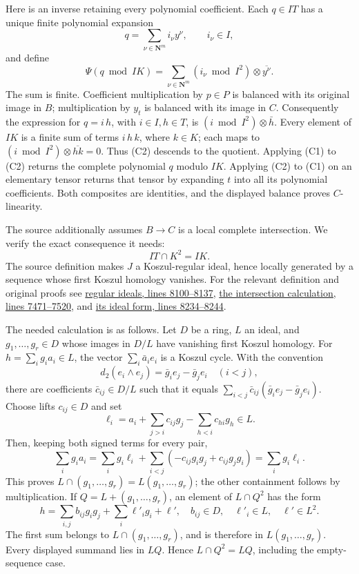 \documentclass[11pt]{article}
\begin{document}
Here is an inverse retaining every polynomial coefficient. Each \(q\in IT\) has a unique finite polynomial expansion \[
 q=\sum_{\nu\in\mathbf N^m}i_\nu y^\nu,\qquad i_\nu\in I,
\] and define \[
 \Psi(q\bmod IK)=
 \sum_{\nu\in\mathbf N^m}(i_\nu\bmod I^2)\otimes\overline{y^\nu}.
\tag{C2}
\] The sum is finite. Coefficient multiplication by \(p\in P\) is balanced with its original image in \(B\); multiplication by \(y_t\) is balanced with its image in \(C\). Consequently the expression for \(q=i\,h\), with \(i\in I,h\in T\), is \((i\bmod I^2)\otimes\bar h\). Every element of \(IK\) is a finite sum of terms \(i\,h\,k\), where \(k\in K\); each maps to \((i\bmod I^2)\otimes\overline{hk}=0\). Thus (C2) descends to the quotient. Applying (C1) to (C2) returns the complete polynomial \(q\) modulo \(IK\). Applying (C2) to (C1) on an elementary tensor returns that tensor by expanding \(t\) into all its polynomial coefficients. Both composites are identities, and the displayed balance proves \(C\)-linearity.

The source additionally assumes \(B\to C\) is a local complete intersection. We verify the exact consequence it needs: \[
 IT\cap K^2=IK.
\tag{C3}
\] The source definition makes \(J\) a Koszul-regular ideal, hence locally generated by a sequence whose first Koszul homology vanishes. For the relevant definition and original proofs see \href{https://github.com/stacks/stacks-project/blob/a04446e5\allowbreak{}7ec1fbc2\allowbreak{}52a871af\allowbreak{}cec7752f\allowbreak{}b2807b14/more-algebra.tex\#L8100}{regular ideals, lines 8100--8137}, \href{https://github.com/stacks/stacks-project/blob/a04446e5\allowbreak{}7ec1fbc2\allowbreak{}52a871af\allowbreak{}cec7752f\allowbreak{}b2807b14/more-algebra.tex\#L7471}{the intersection calculation, lines 7471--7520}, and \href{https://github.com/stacks/stacks-project/blob/a04446e5\allowbreak{}7ec1fbc2\allowbreak{}52a871af\allowbreak{}cec7752f\allowbreak{}b2807b14/more-algebra.tex\#L8234}{its ideal form, lines 8234--8244}.

The needed calculation is as follows. Let \(D\) be a ring, \(L\) an ideal, and \(g_1,\ldots,g_r\in D\) whose images in \(D/L\) have vanishing first Koszul homology. For \(h=\sum_i g_i a_i\in L\), the vector \(\sum_i\bar a_i e_i\) is a Koszul cycle. With the convention \[
 d_2(e_i\wedge e_j)=\bar g_i e_j-\bar g_j e_i\quad(i<j),
\] there are coefficients \(\bar c_{ij}\in D/L\) such that it equals \(\sum_{i<j}\bar c_{ij}(\bar g_i e_j-\bar g_j e_i)\). Choose lifts \(c_{ij}\in D\) and set \[
 \ell_i=a_i+\sum_{j>i}c_{ij}g_j-\sum_{h<i}c_{hi}g_h\in L.
\] Then, keeping both signed terms for every pair, \[
 \sum_i g_i a_i
 =\sum_i g_i\ell_i+
   \sum_{i<j}(-c_{ij}g_i g_j+c_{ij}g_j g_i)
 =\sum_i g_i\ell_i.
\] This proves \(L\cap(g_1,\ldots,g_r)=L(g_1,\ldots,g_r)\); the other containment follows by multiplication. If \(Q=L+(g_1,\ldots,g_r)\), an element of \(L\cap Q^2\) has the form \[
 h=\sum_{i,j}b_{ij}g_i g_j+\sum_i\ell'_i g_i+\ell',
 \quad b_{ij}\in D,\quad\ell'_i\in L,\quad\ell'\in L^2.
\] The first sum belongs to \(L\cap(g_1,\ldots,g_r)\), and is therefore in \(L(g_1,\ldots,g_r)\). Every displayed summand lies in \(LQ\). Hence \(L\cap Q^2=LQ\), including the empty-sequence case.
\end{document}
